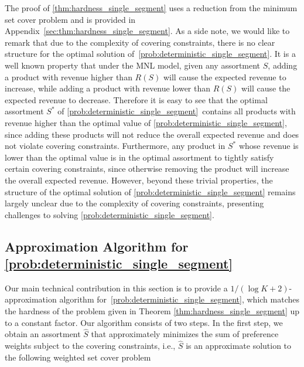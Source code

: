 \documentclass[msom,non-blindrev]{informs3} %
\theoremstyle{definition}
\begin{document}
The proof of \cref{thm:hardness_single_segment}  uses  a reduction from the minimum set cover problem and is  provided in Appendix~\ref{sec:thm:hardness_single_segment}. {  As a side note, we would like to remark that due to the complexity of covering constraints, there is no clear structure for the optimal solution of~\eqref{prob:deterministic_single_segment}. It is a well known property that under the MNL model, given any assortment $S$, adding a product with revenue higher than $R(S)$ will cause the expected revenue to increase, while adding a product with revenue lower than $R(S)$ will cause the expected revenue to decrease. Therefore it is easy to see that the optimal assortment $S^*$ of \eqref{prob:deterministic_single_segment}~contains all products with revenue higher than the optimal value of \eqref{prob:deterministic_single_segment}, since adding these products will not reduce the overall expected revenue and does not violate covering constraints. Furthermore, any product in $S^*$ whose revenue is lower than the optimal value is in the optimal assortment to tightly satisfy certain covering constraints, since otherwise removing the product will increase the overall expected revenue. However, beyond these trivial properties, the structure of the optimal solution of \eqref{prob:deterministic_single_segment} remains largely unclear due to the complexity of covering constraints, presenting challenges to solving \eqref{prob:deterministic_single_segment}.}

\subsection{Approximation Algorithm for  \ref{prob:deterministic_single_segment}}

Our main technical contribution in this section is to provide a $1/(\log K+2)$-approximation algorithm for~\eqref{prob:deterministic_single_segment}, which matches the hardness of the problem given in Theorem \ref{thm:hardness_single_segment} up to a constant factor. Our algorithm consists of two steps. In the first step, we obtain an assortment $\hat{S}$ that approximately minimizes the sum of preference weights subject to the covering constraints, i.e., $\hat{S}$ is an approximate solution to the following weighted set cover problem
\end{document}

